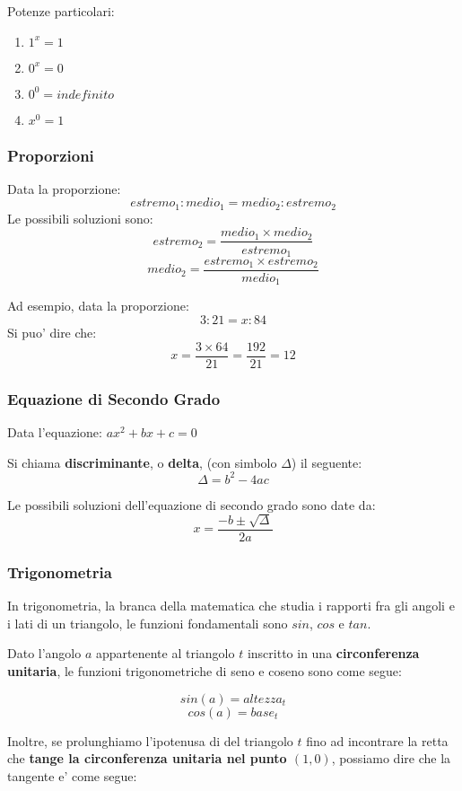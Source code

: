 \documentclass{article}
\begin{document}
{{    Potenze particolari:
    \begin{enumerate}
      \item $ 1^x = 1 $
      \item $ 0^x = 0 $
      \item $ 0^0 = indefinito $
      \item $ x^0 = 1 $
    \end{enumerate}

    \subsubsection{Proporzioni} %
    Data la proporzione:
    $$ estremo_1 : medio_1 = medio_2 : estremo_2 $$
    Le possibili soluzioni sono:
    $$ estremo_2 = \frac{medio_1 \times medio_2}{estremo_1}$$
    $$ medio_2 = \frac{estremo_1 \times estremo_2}{medio_1} $$

    Ad esempio, data la proporzione:
    $$ 3 : 21 = x : 84 $$
    Si puo' dire che:
    $$ x = \frac{3 \times 64}{21} = \frac{192}{21} = 12 $$

    \subsubsection{Equazione di Secondo Grado} %
    Data l'equazione: $ax^2 + bx + c = 0 $

    Si chiama \textbf{discriminante}, o \textbf{delta}, \small{(con simbolo $ \Delta $)} il seguente:
    $$ \Delta = b^2 - 4ac $$

    Le possibili soluzioni dell'equazione di secondo grado sono date da:
    $$ x = \frac{-b \pm \sqrt{\Delta}}{2a} $$

    \pagebreak

    \subsubsection{Trigonometria} %
    In trigonometria, la branca della matematica che studia i rapporti fra gli angoli e i lati di un triangolo, le funzioni fondamentali sono $ sin $, $ cos $ e $ tan $.

    Dato l'angolo $ a $ appartenente al triangolo $ t $ inscritto in una \textbf{circonferenza unitaria}, le funzioni trigonometriche di seno e coseno sono come segue:

    $$ sin(a) = altezza_t $$
    $$ cos(a) = base_t $$

    Inoltre, se prolunghiamo l'ipotenusa di del triangolo $ t $ fino ad incontrare la retta che \textbf{tange la circonferenza unitaria nel punto $ (1,0) $}, possiamo dire che la tangente e' come segue:


}}
\end{document}
